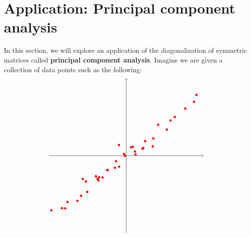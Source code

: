\section{Application: Principal component analysis}

In this section, we will explore an application of the diagonalization
of symmetric matrices called \textbf{principal component analysis}.
Imagine we are given a collection of data points such as the
following:
\begin{equation}\label{eqn:subspace-fitting}
  \begin{tikzpicture}[baseline=-0.5ex]
    \draw[thin,->] (-4,0) -- (4,0);
    \draw[thin,->] (0,-4) -- (0,4);
    \fill[color=red] (-2.25,-1.21) circle (0.06);
    \fill[color=red] (-1.44,-1.28) circle (0.06);
    \fill[color=red] (2.29,1.82) circle (0.06);
    \fill[color=red] (0.25,0.43) circle (0.06);
    \fill[color=red] (-1.57,-1.07) circle (0.06);
    \fill[color=red] (2.51,2.00) circle (0.06);
    \fill[color=red] (-2.53,-2.34) circle (0.06);
    \fill[color=red] (-3.04,-2.40) circle (0.06);
    \fill[color=red] (0.84,0.36) circle (0.06);
    \fill[color=red] (-3.16,-2.73) circle (0.06);
    \fill[color=red] (-2.02,-1.88) circle (0.06);
    \fill[color=red] (3.06,2.44) circle (0.06);
    \fill[color=red] (-1.40,-1.12) circle (0.06);
    \fill[color=red] (-2.09,-1.34) circle (0.06);
    \fill[color=red] (-1.23,-1.13) circle (0.06);
    \fill[color=red] (0.48,0.06) circle (0.06);
    \fill[color=red] (-1.49,-1.20) circle (0.06);
    \fill[color=red] (0.98,0.75) circle (0.06);
    \fill[color=red] (1.40,0.89) circle (0.06);
    \fill[color=red] (-0.12,0.09) circle (0.06);
    \fill[color=red] (0.88,0.40) circle (0.06);
    \fill[color=red] (-0.38,0.55) circle (0.06);
    \fill[color=red] (0.34,0.46) circle (0.06);
    \fill[color=red] (0.45,0.21) circle (0.06);
    \fill[color=red] (-0.59,-0.63) circle (0.06);
    \fill[color=red] (-0.53,-0.29) circle (0.06);
    \fill[color=red] (2.10,1.35) circle (0.06);
    \fill[color=red] (1.65,1.60) circle (0.06);
    \fill[color=red] (-3.88,-2.83) circle (0.06);
    \fill[color=red] (-0.07,-0.01) circle (0.06);
    \fill[color=red] (-0.37,-0.57) circle (0.06);
    \fill[color=red] (-0.99,-0.75) circle (0.06);
    \fill[color=red] (-2.34,-2.08) circle (0.06);
    \fill[color=red] (3.63,3.15) circle (0.06);
    \fill[color=red] (1.37,0.48) circle (0.06);
    \fill[color=red] (-0.96,-0.74) circle (0.06);
    \fill[color=red] (3.51,2.79) circle (0.06);
    \fill[color=red] (-3.33,-2.72) circle (0.06);

\end{tikzpicture}
\end{equation}
